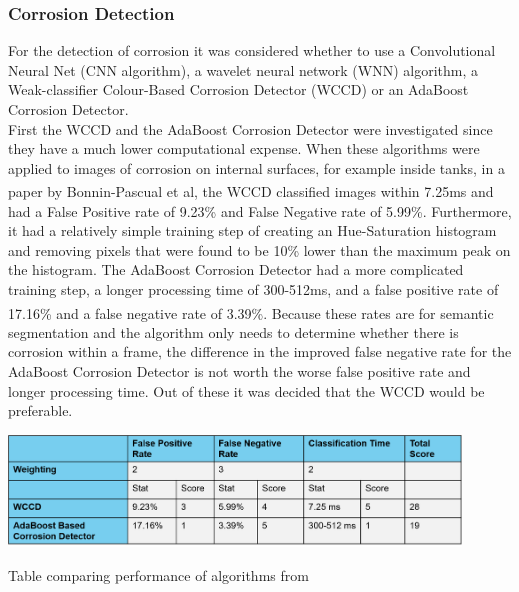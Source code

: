 \documentclass[11pt]{article}		%
\newcommand{\supercite}[1]{\textsuperscript{\cite{#1}}}		%
\begin{document}
        \subsubsection{Corrosion Detection}

	        For the detection of corrosion it was considered whether to use a Convolutional Neural Net (CNN algorithm), a wavelet neural network (WNN) algorithm, a Weak-classifier Colour-Based Corrosion Detector (WCCD) or an AdaBoost Corrosion Detector.
	        \\
	        First the WCCD and the AdaBoost Corrosion Detector were investigated since they have a much lower computational expense. 
	        When these algorithms were applied to images of corrosion on internal surfaces, for example inside tanks, in a paper by Bonnin-Pascual et al\supercite{WCCD}, the WCCD classified images within 7.25ms and had a False Positive rate of 9.23\% and False Negative rate of 5.99\%. Furthermore, it had a relatively simple training step of creating an Hue-Saturation histogram and removing pixels that were found to be 10\% lower than the maximum peak on the histogram.
	        The AdaBoost Corrosion Detector had a more complicated training step, a longer processing time of 300-512ms, and a false positive rate of 17.16\% and a false negative rate of 3.39\%.\supercite{WCCD}  
	        Because these rates are for semantic segmentation and the algorithm only needs to determine whether there is corrosion within a frame, the difference in the improved false negative rate for the AdaBoost Corrosion Detector is not worth the worse false positive rate and longer processing time. 
	        Out of these it was decided that the WCCD would be preferable.  
	        \\
			\begin{table}[h]
				\centering
				\includegraphics[width=0.9\textwidth]{WCCD_corrosion_table}
				\caption{Table comparing performance of algorithms from \cite{WCCD}}
				\label{WCCD_comparison}
			\end{table}
\end{document}
